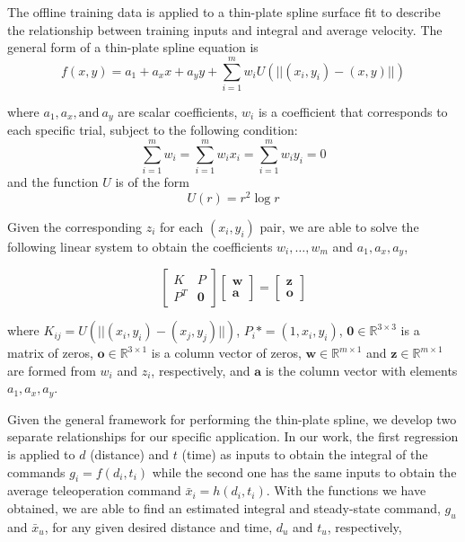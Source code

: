 \documentclass[letterpaper, 10 pt, conference]{ieeeconf}  %
\begin{document}
The offline training data is applied to a thin-plate spline surface fit to describe the relationship between training inputs and integral and average velocity. The general form of a thin-plate spline equation is 
\begin{equation}
    f(x,y) = a_1 + a_xx + a_yy + \sum_{i=1}^mw_iU(||(x_i,y_i)-(x,y)||)
\end{equation}

where $a_1,a_x,\text{and}~a_y$ are scalar coefficients, $w_i$ is a coefficient that corresponds to each specific trial, subject to the following condition: \begin{equation}
\sum_{i=1}^mw_i=\sum_{i=1}^mw_ix_i=\sum_{i=1}^mw_iy_i=0
\end{equation}
and the function $U$ is of the form
\begin{equation}
  U(r) = r^2\log{r} 
\end{equation}

Given the corresponding $z_i$ for each $(x_i,y_i)$ pair, we are able to solve the following linear system to obtain the coefficients $w_i,\ldots,w_m$ and $a_1,a_x,a_y$,

\begin{equation}
    \begin{bmatrix}
    K&P\\
    P^T& \mathbf{0}
    \end{bmatrix}
    \begin{bmatrix}
    \mathbf{w}\\
    \mathbf{a}
    \end{bmatrix} = 
    \begin{bmatrix}
    \mathbf{z}\\
    \mathbf{o}
    \end{bmatrix}
\end{equation}

where $K_{ij} = U(||(x_i,y_i)-(x_j,y_j)||)$, $P_i* = (1,x_i,y_i)$, $\mathbf{0}  \in \mathbb{R}^{3\times3}$ is a matrix of zeros, $\mathbf{o} \in \mathbb{R}^{3\times1}$ is a column vector of zeros, $\mathbf{w} \in \mathbb{R}^{m\times1}$ and $\mathbf{z} \in \mathbb{R}^{m\times1}$ are formed from $w_i$ and $z_i$, respectively, and $\mathbf{a}$ is the column vector with elements $a_1,a_x,a_y$.

Given the general framework for performing the thin-plate spline, we develop two separate relationships for our specific application. In our work, the first regression is applied to $d$ (distance) and $t$ (time) as inputs to obtain the integral of the commands $g_i = f(d_i,t_i)$ while the second one has the same inputs to obtain the average teleoperation command $\bar{x}_i = h(d_i,t_i)$. With the functions we have obtained, we are able to find an estimated integral and steady-state command, $g_u$ and $\bar{x}_u$, for any given desired distance and time, $d_u$ and $t_u$, respectively,
\end{document}
